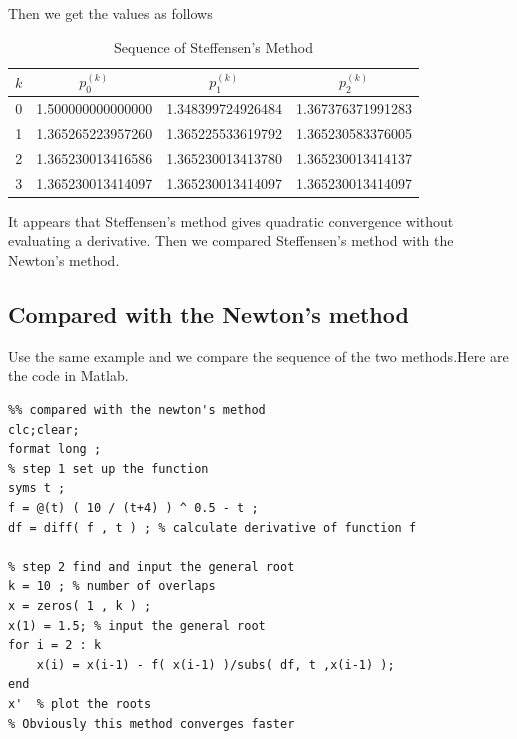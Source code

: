 \documentclass{article}
\begin{document}
Then we get the values as follows

\begin{table}[h!]
\centering
\begin{center}
 \begin{tabular}{c c c c} 
 \hline
 \hline
$k$ & $p^{(k)}_{0}$ & $p^{(k)}_{1}$  & $p^{(k)}_{2}$\\ \hline
0 & 1.500000000000000 &1.348399724926484 &1.367376371991283\\ 
1 & 1.365265223957260 &1.365225533619792 &1.365230583376005\\ 
2 & 1.365230013416586 &1.365230013413780 &1.365230013414137\\ 
3 & 1.365230013414097 &1.365230013414097 &1.365230013414097\\ 
\hline
\hline
\end{tabular}
\end{center}
\caption{Sequence of Steffensen's Method}
\end{table}

It appears that Steffensen's method gives quadratic convergence without evaluating a derivative.
Then we compared Steffensen's method with the Newton's method.

\subsection{Compared with the Newton's method}

Use the same example and we compare the sequence of the two methods.Here are the code in Matlab.

\begin{lstlisting}
%% compared with the newton's method
clc;clear;
format long ;
% step 1 set up the function
syms t ;
f = @(t) ( 10 / (t+4) ) ^ 0.5 - t ;
df = diff( f , t ) ; % calculate derivative of function f

% step 2 find and input the general root
k = 10 ; % number of overlaps
x = zeros( 1 , k ) ;
x(1) = 1.5; % input the general root
for i = 2 : k
    x(i) = x(i-1) - f( x(i-1) )/subs( df, t ,x(i-1) );
end
x'  % plot the roots
% Obviously this method converges faster
\end{lstlisting}
\end{document}
